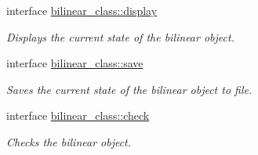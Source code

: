 \begin{DoxyCompactItemize}
interface \hyperlink{interfacebilinear__class_1_1display}{bilinear\-\_\-class\-::display}
\begin{DoxyCompactList}\small\item\em Displays the current state of the bilinear object. \end{DoxyCompactList}\item 
interface \hyperlink{interfacebilinear__class_1_1save}{bilinear\-\_\-class\-::save}
\begin{DoxyCompactList}\small\item\em Saves the current state of the bilinear object to file. \end{DoxyCompactList}\item 
interface \hyperlink{interfacebilinear__class_1_1check}{bilinear\-\_\-class\-::check}
\begin{DoxyCompactList}\small\item\em Checks the bilinear object. \end{DoxyCompactList}\end{DoxyCompactItemize}
